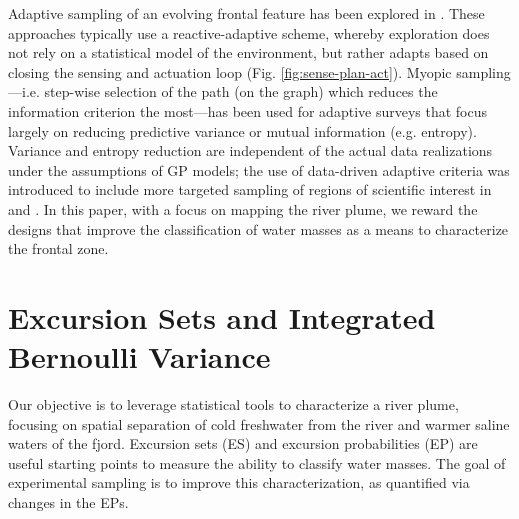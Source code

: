 \documentclass[aoas]{imsart}
\begin{document}
Adaptive sampling of an evolving frontal feature has been explored in
\cite{fronts11,Zhang2012,Pinto2018,costa19}. These approaches
typically use a reactive-adaptive scheme, whereby exploration does not
rely on a statistical model of the environment, but rather adapts
based on closing the sensing and actuation loop
(Fig. \ref{fig:sense-plan-act}). Myopic sampling—i.e. step-wise
selection of the path (on the graph) which reduces the information
criterion the most—has been used for adaptive surveys
\citep{singh2009efficient,Binney2013} that focus largely on reducing
predictive variance or mutual information (e.g. entropy). Variance and
entropy reduction are independent of the actual data realizations
under the assumptions of GP models; the use of data-driven adaptive
criteria was introduced to include more targeted sampling of regions
of scientific interest in \cite{Low2009} and \cite{fossuminformation}.
In this paper, with a focus on mapping the river plume, we reward
the designs that improve the classification of water masses as a
means to characterize the frontal zone.







\section{Excursion Sets and Integrated Bernoulli Variance}
\label{sec:ESEP}

Our objective is to leverage statistical tools to characterize a river plume, focusing on spatial separation of cold freshwater from the river and warmer saline waters of the fjord. Excursion sets (ES) and excursion probabilities (EP) are useful starting points to measure the ability to classify water masses. The goal of experimental sampling is to improve this characterization, as quantified via changes in the EPs.
\end{document}
